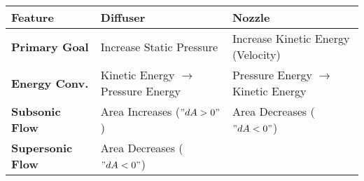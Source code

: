 \begin{longtable}[]{@{}lll@{}}
\toprule
\begin{minipage}[b]{0.15\columnwidth}\raggedright
Feature\strut
\end{minipage} & \begin{minipage}[b]{0.38\columnwidth}\raggedright
Diffuser\strut
\end{minipage} & \begin{minipage}[b]{0.39\columnwidth}\raggedright
Nozzle\strut
\end{minipage}\tabularnewline
\midrule
\endhead
\begin{minipage}[t]{0.15\columnwidth}\raggedright
\textbf{Primary Goal}\strut
\end{minipage} & \begin{minipage}[t]{0.38\columnwidth}\raggedright
Increase Static Pressure\strut
\end{minipage} & \begin{minipage}[t]{0.39\columnwidth}\raggedright
Increase Kinetic Energy (Velocity)\strut
\end{minipage}\tabularnewline
\begin{minipage}[t]{0.15\columnwidth}\raggedright
\textbf{Energy Conv.}\strut
\end{minipage} & \begin{minipage}[t]{0.38\columnwidth}\raggedright
Kinetic Energy \(\to\) Pressure Energy\strut
\end{minipage} & \begin{minipage}[t]{0.39\columnwidth}\raggedright
Pressure Energy \(\to\) Kinetic Energy\strut
\end{minipage}\tabularnewline
\begin{minipage}[t]{0.15\columnwidth}\raggedright
\textbf{Subsonic Flow}\strut
\end{minipage} & \begin{minipage}[t]{0.38\columnwidth}\raggedright
Area Increases (\("dA > 0"\))\strut
\end{minipage} & \begin{minipage}[t]{0.39\columnwidth}\raggedright
Area Decreases (\("dA < 0"\))\strut
\end{minipage}\tabularnewline
\begin{minipage}[t]{0.15\columnwidth}\raggedright
\textbf{Supersonic Flow}\strut
\end{minipage} & \begin{minipage}[t]{0.38\columnwidth}\raggedright
Area Decreases (\("dA < 0"\))\strut
\end{minipage} & \begin{minipage}[t]{0.39\columnwidth}\raggedright

\end{minipage}
\end{longtable}
